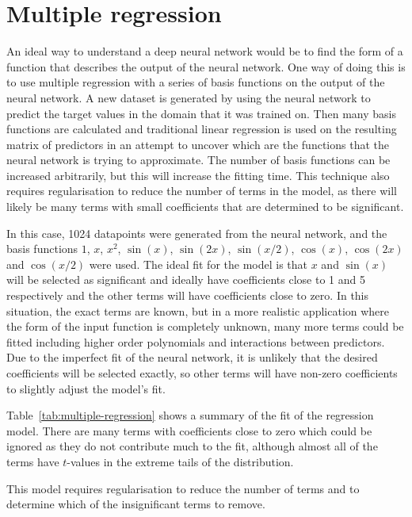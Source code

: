 \section{Multiple regression} \label{sec:multiple-regression}

An ideal way to understand a deep neural network would be to find the form of a function that describes the output of the neural network.
One way of doing this is to use multiple regression with a series of basis functions on the output of the neural network.
A new dataset is generated by using the neural network to predict the target values in the domain that it was trained on.
Then many basis functions are calculated and traditional linear regression is used on the resulting matrix of predictors in an attempt to uncover which are the  functions that the neural network is trying to approximate.
The number of basis functions can be increased arbitrarily, but this will increase the fitting time.
This technique also requires regularisation to reduce the number of terms in the model, as there will likely be many terms with small coefficients that are determined to be significant.

In this case, 1024 datapoints were generated from the neural network, and the basis functions \(1\), \(x\), \(x^2\), \(\sin(x)\), \(\sin(2x)\), \(\sin(x/2)\), \(\cos(x)\), \(\cos(2x)\) and \(\cos(x/2)\) were used.
The ideal fit for the model is that \(x\) and \(\sin(x)\) will be selected as significant and ideally have coefficients close to 1 and 5 respectively and the other terms will have coefficients close to zero.
In this situation, the exact  terms are known, but in a more realistic application where the form of the input function is completely unknown, many more terms could be fitted including higher order polynomials and interactions between predictors.
Due to the imperfect fit of the neural network, it is unlikely that the desired coefficients will be selected exactly, so other terms will have non-zero coefficients to slightly adjust the model's fit.

Table~\ref{tab:multiple-regression} shows a summary of the fit of the regression model.
There are many terms with coefficients close to zero which could be ignored as they do not contribute much to the fit, although almost all of the terms have \(t\)-values in the extreme tails of the distribution.


This model requires regularisation to reduce the number of terms and to determine which of the insignificant terms to remove.

